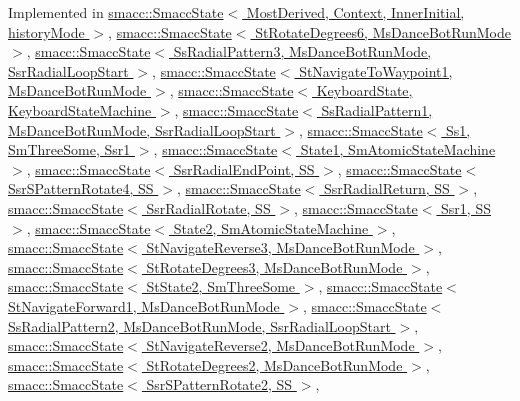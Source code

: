 Implemented in \hyperlink{classsmacc_1_1SmaccState_afc39f8e0ca4001b2159a100da2fccd0e}{smacc\+::\+Smacc\+State$<$ Most\+Derived, Context, Inner\+Initial, history\+Mode $>$}, \hyperlink{classsmacc_1_1SmaccState_afc39f8e0ca4001b2159a100da2fccd0e}{smacc\+::\+Smacc\+State$<$ St\+Rotate\+Degrees6, Ms\+Dance\+Bot\+Run\+Mode $>$}, \hyperlink{classsmacc_1_1SmaccState_afc39f8e0ca4001b2159a100da2fccd0e}{smacc\+::\+Smacc\+State$<$ Ss\+Radial\+Pattern3, Ms\+Dance\+Bot\+Run\+Mode, Ssr\+Radial\+Loop\+Start $>$}, \hyperlink{classsmacc_1_1SmaccState_afc39f8e0ca4001b2159a100da2fccd0e}{smacc\+::\+Smacc\+State$<$ St\+Navigate\+To\+Waypoint1, Ms\+Dance\+Bot\+Run\+Mode $>$}, \hyperlink{classsmacc_1_1SmaccState_afc39f8e0ca4001b2159a100da2fccd0e}{smacc\+::\+Smacc\+State$<$ Keyboard\+State, Keyboard\+State\+Machine $>$}, \hyperlink{classsmacc_1_1SmaccState_afc39f8e0ca4001b2159a100da2fccd0e}{smacc\+::\+Smacc\+State$<$ Ss\+Radial\+Pattern1, Ms\+Dance\+Bot\+Run\+Mode, Ssr\+Radial\+Loop\+Start $>$}, \hyperlink{classsmacc_1_1SmaccState_afc39f8e0ca4001b2159a100da2fccd0e}{smacc\+::\+Smacc\+State$<$ Ss1, Sm\+Three\+Some, Ssr1 $>$}, \hyperlink{classsmacc_1_1SmaccState_afc39f8e0ca4001b2159a100da2fccd0e}{smacc\+::\+Smacc\+State$<$ State1, Sm\+Atomic\+State\+Machine $>$}, \hyperlink{classsmacc_1_1SmaccState_afc39f8e0ca4001b2159a100da2fccd0e}{smacc\+::\+Smacc\+State$<$ Ssr\+Radial\+End\+Point, S\+S $>$}, \hyperlink{classsmacc_1_1SmaccState_afc39f8e0ca4001b2159a100da2fccd0e}{smacc\+::\+Smacc\+State$<$ Ssr\+S\+Pattern\+Rotate4, S\+S $>$}, \hyperlink{classsmacc_1_1SmaccState_afc39f8e0ca4001b2159a100da2fccd0e}{smacc\+::\+Smacc\+State$<$ Ssr\+Radial\+Return, S\+S $>$}, \hyperlink{classsmacc_1_1SmaccState_afc39f8e0ca4001b2159a100da2fccd0e}{smacc\+::\+Smacc\+State$<$ Ssr\+Radial\+Rotate, S\+S $>$}, \hyperlink{classsmacc_1_1SmaccState_afc39f8e0ca4001b2159a100da2fccd0e}{smacc\+::\+Smacc\+State$<$ Ssr1, S\+S $>$}, \hyperlink{classsmacc_1_1SmaccState_afc39f8e0ca4001b2159a100da2fccd0e}{smacc\+::\+Smacc\+State$<$ State2, Sm\+Atomic\+State\+Machine $>$}, \hyperlink{classsmacc_1_1SmaccState_afc39f8e0ca4001b2159a100da2fccd0e}{smacc\+::\+Smacc\+State$<$ St\+Navigate\+Reverse3, Ms\+Dance\+Bot\+Run\+Mode $>$}, \hyperlink{classsmacc_1_1SmaccState_afc39f8e0ca4001b2159a100da2fccd0e}{smacc\+::\+Smacc\+State$<$ St\+Rotate\+Degrees3, Ms\+Dance\+Bot\+Run\+Mode $>$}, \hyperlink{classsmacc_1_1SmaccState_afc39f8e0ca4001b2159a100da2fccd0e}{smacc\+::\+Smacc\+State$<$ St\+State2, Sm\+Three\+Some $>$}, \hyperlink{classsmacc_1_1SmaccState_afc39f8e0ca4001b2159a100da2fccd0e}{smacc\+::\+Smacc\+State$<$ St\+Navigate\+Forward1, Ms\+Dance\+Bot\+Run\+Mode $>$}, \hyperlink{classsmacc_1_1SmaccState_afc39f8e0ca4001b2159a100da2fccd0e}{smacc\+::\+Smacc\+State$<$ Ss\+Radial\+Pattern2, Ms\+Dance\+Bot\+Run\+Mode, Ssr\+Radial\+Loop\+Start $>$}, \hyperlink{classsmacc_1_1SmaccState_afc39f8e0ca4001b2159a100da2fccd0e}{smacc\+::\+Smacc\+State$<$ St\+Navigate\+Reverse2, Ms\+Dance\+Bot\+Run\+Mode $>$}, \hyperlink{classsmacc_1_1SmaccState_afc39f8e0ca4001b2159a100da2fccd0e}{smacc\+::\+Smacc\+State$<$ St\+Rotate\+Degrees2, Ms\+Dance\+Bot\+Run\+Mode $>$}, \hyperlink{classsmacc_1_1SmaccState_afc39f8e0ca4001b2159a100da2fccd0e}{smacc\+::\+Smacc\+State$<$ Ssr\+S\+Pattern\+Rotate2, S\+S $>$}, 
